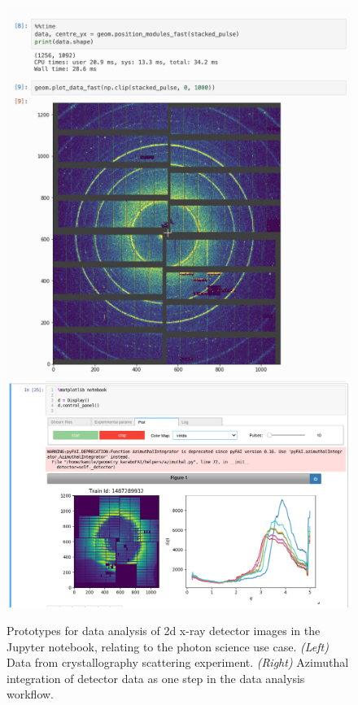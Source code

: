 \begin{task}[
  title=Reproducible photon science workflows at European XFEL,
  id=reproducibility-xfel,
  lead=XFEL,
  PM=38,
  wphases={7-48},
  partners={INSERM,SRL,UPSUD,EGI}
  ]
  \medskip

\begin{figure}[tb]
    \centering
    \includegraphics[height=0.27\textheight]{images/photon-science-prototype1.png}
    \includegraphics[height=0.27\textheight]{images/photon-science-prototype2.png}
    \caption{Prototypes for data analysis of 2d x-ray detector images
      in the Jupyter notebook, relating to the
      photon science use case.
      \emph{(Left)} Data from crystallography
      scattering experiment. \emph{(Right)} Azimuthal integration of detector
      data as one step in the data analysis workflow.}
    \label{fig:photon-science-example}
  \end{figure}



\end{task}
